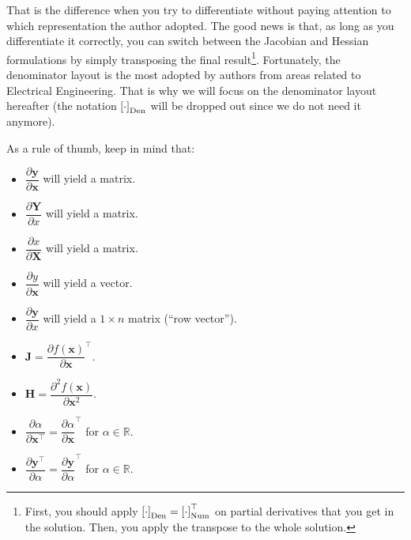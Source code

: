 \documentclass{article}
\newcommand{\trans}{\top}
\begin{document}
That is the difference when you try to differentiate without paying attention to which representation the author adopted. The good news is that, as long as you differentiate it correctly, you can switch between the Jacobian and Hessian formulations by simply transposing the final result\footnote{First, you should apply \(\left[\cdot\right]_{\textnormal{Den}} = \left[\cdot\right]_{\textnormal{Num}}^{\trans}\) on partial derivatives that you get in the solution. Then, you apply the transpose to the whole solution.}. Fortunately, the denominator layout is the most adopted by authors from areas related to Electrical Engineering. That is why we will focus on the denominator layout hereafter (the notation \(\left[\cdot\right]_{\textnormal{Den}}\) will be dropped out since we do not need it anymore).

As a rule of thumb, keep in mind that:
\begin{itemize}
    \item \(\dfrac{\partial \mathbf{y}}{\partial \mathbf{x}}\) will yield a matrix.
    \item \(\dfrac{\partial \mathbf{Y}}{\partial x}\) will yield a matrix.
    \item \(\dfrac{\partial x}{\partial \mathbf{X}}\) will yield a matrix.
    \item \(\dfrac{\partial y}{\partial \mathbf{x}}\) will yield a vector.
    \item \(\dfrac{\partial \mathbf{y}}{\partial x}\) will yield a \(1\times n\) matrix (``row vector'').
    \item \(\mathbf{J} = \dfrac{\partial f(\mathbf{x})}{\partial \mathbf{x}}^\top\).
    \item \(\mathbf{H} = \dfrac{\partial^{2} f(\mathbf{x})}{\partial \mathbf{x}^2}\).
    \item \(\dfrac{\partial\alpha}{\partial \mathbf{x}^\top} = \dfrac{\partial\alpha}{\partial \mathbf{x}}^\top\) for \(\alpha\in \mathbb{R}\).
    \item \(\dfrac{\partial \mathbf{y}^\top}{\partial \alpha} = \dfrac{\partial \mathbf{y}}{\partial \alpha}^\top\) for \(\alpha\in \mathbb{R}\).
\end{itemize}
\vspace{0.2ex}
\end{document}
